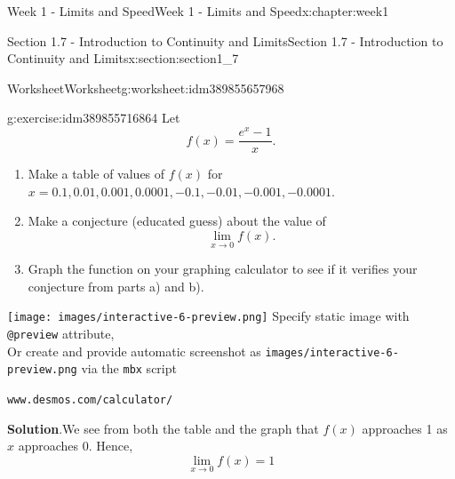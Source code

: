 \documentclass[oneside,10pt,]{book}
\newcommand{\blocktitlefont}{\relax}
\newcommand{\mono}[1]{\texttt{#1}}
\numberwithin{equation}{section}
\newlength{\qrsize}
\newlength{\previewwidth}
\begin{document}
\begin{chapterptx}{Week 1 - Limits and Speed}{}{Week 1 - Limits and Speed}{}{}{x:chapter:week1}
\begin{sectionptx}{Section 1.7 - Introduction to Continuity and Limits}{}{Section 1.7 - Introduction to Continuity and Limits}{}{}{x:section:section1_7}
\begin{worksheet-subsection}{Worksheet}{}{Worksheet}{}{}{g:worksheet:idm389855657968}
\begin{divisionexercise}{3}{}{}{g:exercise:idm389855716864}%
Let%
\begin{equation*}
f(x) = \frac{e^x - 1}{x}. 
\end{equation*}
%
%
\begin{enumerate}[label=(\alph*)]
\item{}Make a table of values of \(f(x)\) for \(x=0.1,0.01,0.001,0.0001,-0.1,-0.01,-0.001,-0.0001\).%
\item{}Make a conjecture (educated guess) about the value of%
\begin{equation*}
\lim _{x\to 0} f(x) .
\end{equation*}
%
\item{}Graph the function on your graphing calculator to see if it verifies your conjecture from parts a) and b).%
\end{enumerate}
\setlength{\qrsize}{9em}
\setlength{\previewwidth}{\linewidth}
\addtolength{\previewwidth}{-\qrsize}
\begin{tcbraster}[raster columns=2, raster column skip=1pt, raster halign=center, raster force size=false, raster left skip=0pt, raster right skip=0pt]%
\begin{tcolorbox}[previewstyle, width=\previewwidth]%
%
{\texttt{[image: images/interactive-6-preview.png]}}%
{\small{}Specify static image with \mono{@preview} attribute,\\Or create and provide automatic screenshot as \mono{images/interactive-6-preview.png} via the \mono{mbx} script}%
\end{tcolorbox}%
\begin{tcolorbox}[qrstyle]%
{\hypersetup{urlcolor=black}}%
\end{tcolorbox}%
\begin{tcolorbox}[captionstyle]%
\small \mono{www.desmos.com/calculator/}\end{tcolorbox}%
\end{tcbraster}%
%
\textbf{\blocktitlefont Solution}.\hypertarget{g:solution:idm389855760480}{}\quad{}We see from both the table and the graph that \(f(x)\) approaches 1 as \(x\) approaches 0. Hence,%
\begin{equation*}
\lim_{x\to 0} f(x)=1
\end{equation*}
%
\par
\setlength{\qrsize}{9em}
\setlength{\previewwidth}{\linewidth}
\addtolength{\previewwidth}{-\qrsize}
\begin{tcbraster}[raster columns=2, raster column skip=1pt, raster halign=center, raster force size=false, raster left skip=0pt, raster right skip=0pt]%

\end{tcbraster}
\end{divisionexercise}
\end{worksheet-subsection}
\end{sectionptx}
\end{chapterptx}
\end{document}
